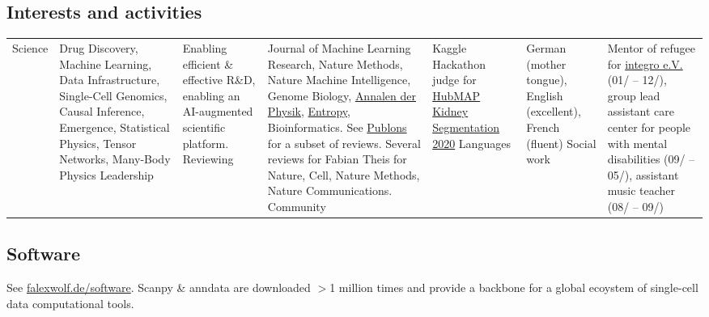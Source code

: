 \subsection*{Interests and activities}\vspace{-1em}
\begin{longtable}[t]{R{\widthC} p{\widthB}}
Science
& Drug Discovery, Machine Learning, Data Infrastructure, Single-Cell Genomics, Causal Inference, Emergence,  Statistical Physics, Tensor Networks, Many-Body Physics
\newline
Leadership 
& Enabling efficient \& effective R\&D, enabling an AI-augmented scientific platform.
\newline
Reviewing
& Journal of Machine Learning Research, Nature Methods, Nature Machine Intelligence, Genome Biology,  \href{https://en.wikipedia.org/wiki/Annalen_der_Physik}{Annalen der  Physik}, \href{https://en.wikipedia.org/wiki/Entropy_(journal)}{Entropy}, Bioinformatics. See \href{https://publons.com/author/1299815/f-alexander-wolf}{Publons} for a subset of reviews. Several reviews for Fabian Theis for Nature, Cell, Nature Methods, Nature Communications.
\newline
Community
& Kaggle Hackathon judge for \href{https://www.kaggle.com/c/hubmap-kidney-segmentation}{HubMAP Kidney Segmentation 2020}
\newline
Languages
& German (mother tongue), English (excellent), French (fluent)
\newline
Social work
& Mentor of refugee for \href{http://integro-ev.de/}{integro e.V.} (01/ -- 12/), group lead assistant care center for people with mental disabilities (09/ -- 05/), assistant music teacher (08/ -- 09/)
\end{longtable}

\subsection*{Software}
See \href{http://falexwolf.de/software/}{falexwolf.de/software}. Scanpy \& anndata are downloaded $>$1 million times and provide a backbone for a global ecoystem of single-cell data computational tools.

